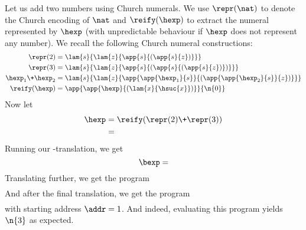 Let us add two numbers using Church numerals.
We use $\repr(\nat)$ to denote the Church encoding of $\nat$ and $\reify(\hexp)$ to extract the numeral represented by $\hexp$ (with unpredictable behaviour if $\hexp$ does not represent any number).
We recall the following Church numeral constructions:
\begin{align*}
  \repr(2) &= \lam{s}{\lam{z}{\app{s}{(\app{s}{z})}}} \\
  \repr(3) &= \lam{s}{\lam{z}{\app{s}{(\app{s}{(\app{s}{z})})}}} \\
  \hexp_1 \+ \hexp_2 &= \lam{s}{\lam{z}{\app{\app{\hexp_1}{s}}{(\app{\app{\hexp_2}{s}}{z})}}} \\
  \reify(\hexp) &= \app{\app{\hexp}{(\lam{x}{\hsuc{x}})}}{\n{0}}
\end{align*}
Now let
\begin{align*}
  \hexp &= \reify(\repr(2) \+ \repr(3)) \\
  &= 
\end{align*}
Running our \hlang-\blang translation, we get
\[
\bexp = 
\]
Translating further, we get the \slang program
{\footnotesize
\begin{align*}
\quad 
\end{align*}
}
And after the final translation, we get the \mlang program
{\footnotesize
\begin{align*}

\end{align*}
}
with starting address $\addr = 1$.
And indeed, evaluating this program yields $\n{3}$ as expected.

